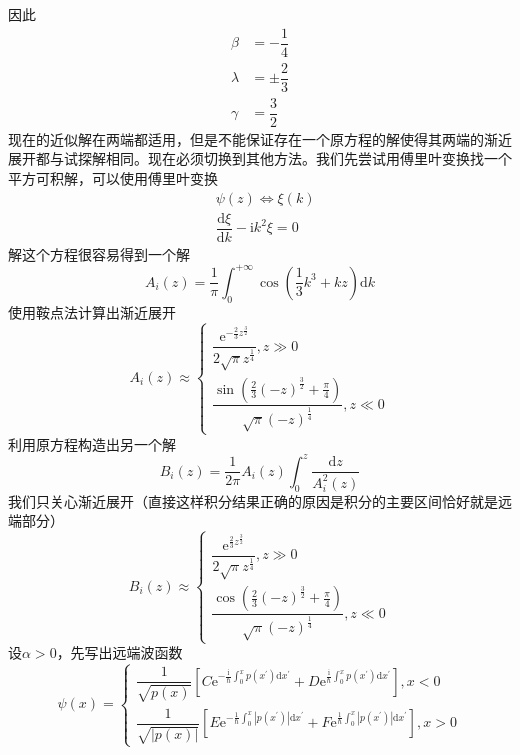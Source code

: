 \documentclass[12pt, a4paper, oneside]{ctexart}
\begin{document}
	\quad\quad 因此
	\begin{align}
		\beta&=-\dfrac{1}{4}\\
		\lambda&=\pm\dfrac{2}{3}\\
		\gamma&=\dfrac{3}{2}
	\end{align}
	\quad\quad 现在的近似解在两端都适用，但是不能保证存在一个原方程的解使得其两端的渐近展开都与试探解相同。现在必须切换到其他方法。我们先尝试用傅里叶变换找一个平方可积解，可以使用傅里叶变换
	\begin{align}
		&\psi(z)\Longleftrightarrow \xi(k)\\
		&\dfrac{\mathrm{d}\xi}{\mathrm{d}k}-\mathrm{i}k^{2}\xi=0
	\end{align}
	\quad\quad 解这个方程很容易得到一个解
	\begin{equation}
		A_{i}(z)=\dfrac{1}{\pi}\int_{0}^{+\infty}\cos\left(\dfrac{1}{3}k^{3}+kz\right)\mathrm{d}k
	\end{equation}
	\quad\quad 使用鞍点法计算出渐近展开
	\begin{equation}
		A_{i}(z)\approx\left\{\begin{matrix}
		\dfrac{\mathrm{e}^{-\frac{2}{3}z^{\frac{3}{2}}}}{2\sqrt{\pi}z^{\frac{1}{4}}},z\gg0	\\\dfrac{\sin\left(\frac{2}{3}\left(-z\right)^{\frac{3}{2}}+\frac{\pi}{4}\right)}{\sqrt{\pi}\left(-z\right)^{\frac{1}{4}}},z\ll0
		\end{matrix}\right.
	\end{equation}
	\quad\quad 利用原方程构造出另一个解
	\begin{equation}
		B_{i}(z)=\dfrac{1}{2\pi}A_{i}(z)\int_{0}^{z}\dfrac{\mathrm{d}z}{A_{i}^{2}(z)}
	\end{equation}
	\quad\quad 我们只关心渐近展开（直接这样积分结果正确的原因是积分的主要区间恰好就是远端部分）
	\begin{equation}
		B_{i}(z)\approx\left\{\begin{matrix}
			\dfrac{\mathrm{e}^{\frac{2}{3}z^{\frac{3}{2}}}}{2\sqrt{\pi}z^{\frac{1}{4}}},z\gg0	\\\dfrac{\cos\left(\frac{2}{3}\left(-z\right)^{\frac{3}{2}}+\frac{\pi}{4}\right)}{\sqrt{\pi}\left(-z\right)^{\frac{1}{4}}},z\ll0
		\end{matrix}\right.
	\end{equation}
	\quad\quad 设$\alpha>0$，先写出远端波函数
	\begin{equation}
		\psi(x)=\left\{\begin{matrix}
		\dfrac{1}{\sqrt{p(x)}}\left[C\mathrm{e}^{-\frac{\mathrm{i}}{\hbar}\int_{0}^{x}p(x^{\prime})\mathrm{d}x^{\prime}}+D\mathrm{e}^{\frac{\mathrm{i}}{\hbar}\int_{0}^{x}p(x^{\prime})\mathrm{d}x^{\prime}}\right],x<0	\\\dfrac{1}{\sqrt{|p(x)|}}\left[E\mathrm{e}^{-\frac{1}{\hbar}\int_{0}^{x}|p(x^{\prime})|\mathrm{d}x^{\prime}}+F\mathrm{e}^{\frac{1}{\hbar}\int_{0}^{x}|p(x^{\prime})|\mathrm{d}x^{\prime}}\right],x>0
		\end{matrix}\right.
	\end{equation}
\end{document}
